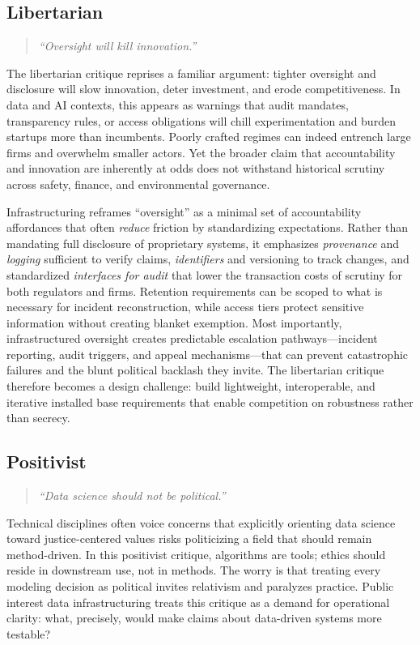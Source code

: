 \documentclass[acmsmall,screen]{acmart}
\begin{document}
\subsection*{Libertarian}
\begin{quote}\centering
\textit{``Oversight will kill innovation.''}
\end{quote}

\noindent The libertarian critique reprises a familiar argument: tighter oversight and disclosure will slow innovation, deter investment, and erode competitiveness. In data and AI contexts, this appears as warnings that audit mandates, transparency rules, or access obligations will chill experimentation and burden startups more than incumbents. Poorly crafted regimes can indeed entrench large firms and overwhelm smaller actors. Yet the broader claim that accountability and innovation are inherently at odds does not withstand historical scrutiny across safety, finance, and environmental governance.

Infrastructuring reframes ``oversight'' as a minimal set of accountability affordances that often \emph{reduce} friction by standardizing expectations. Rather than mandating full disclosure of proprietary systems, it emphasizes \emph{provenance} and \emph{logging} sufficient to verify claims, \emph{identifiers} and versioning to track changes, and standardized \emph{interfaces for audit} that lower the transaction costs of scrutiny for both regulators and firms. Retention requirements can be scoped to what is necessary for incident reconstruction, while access tiers protect sensitive information without creating blanket exemption. Most importantly, infrastructured oversight creates predictable escalation pathways---incident reporting, audit triggers, and appeal mechanisms---that can prevent catastrophic failures and the blunt political backlash they invite. The libertarian critique therefore becomes a design challenge: build lightweight, interoperable, and iterative installed base requirements that enable competition on robustness rather than secrecy.

\subsection*{Positivist}
\begin{quote}\centering
\textit{``Data science should not be political.''}
\end{quote}

\noindent Technical disciplines often voice concerns that explicitly orienting data science toward justice-centered values risks politicizing a field that should remain method-driven. In this positivist critique, algorithms are tools; ethics should reside in downstream use, not in methods. The worry is that treating every modeling decision as political invites relativism and paralyzes practice. Public interest data infrastructuring treats this critique as a demand for operational clarity: what, precisely, would make claims about data-driven systems more testable?
\end{document}
